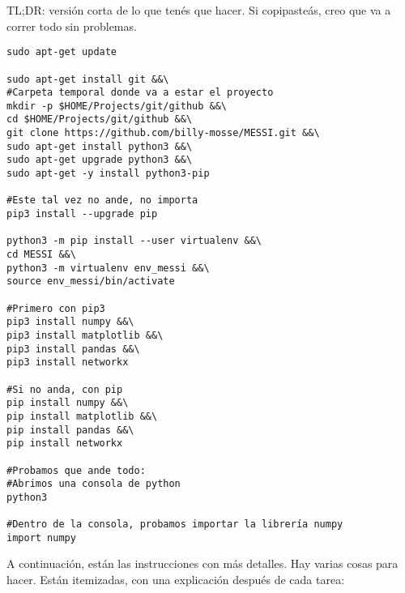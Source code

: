 \documentclass[10pt,a4paper]{report}
\begin{document}


TL;DR: versión corta de lo que tenés que hacer. Si copipasteás, creo que va a correr todo sin problemas.

\begin{lstlisting}
sudo apt-get update

sudo apt-get install git &&\
#Carpeta temporal donde va a estar el proyecto
mkdir -p $HOME/Projects/git/github &&\
cd $HOME/Projects/git/github &&\
git clone https://github.com/billy-mosse/MESSI.git &&\
sudo apt-get install python3 &&\
sudo apt-get upgrade python3 &&\
sudo apt-get -y install python3-pip

#Este tal vez no ande, no importa
pip3 install --upgrade pip

python3 -m pip install --user virtualenv &&\
cd MESSI &&\
python3 -m virtualenv env_messi &&\
source env_messi/bin/activate

#Primero con pip3
pip3 install numpy &&\
pip3 install matplotlib &&\
pip3 install pandas &&\
pip3 install networkx

#Si no anda, con pip
pip install numpy &&\
pip install matplotlib &&\
pip install pandas &&\
pip install networkx

#Probamos que ande todo:
#Abrimos una consola de python
python3

#Dentro de la consola, probamos importar la librería numpy
import numpy
\end{lstlisting}


A continuación, están las instrucciones con más detalles. Hay varias cosas para hacer. Están itemizadas, con una explicación después de cada tarea:
\end{document}
